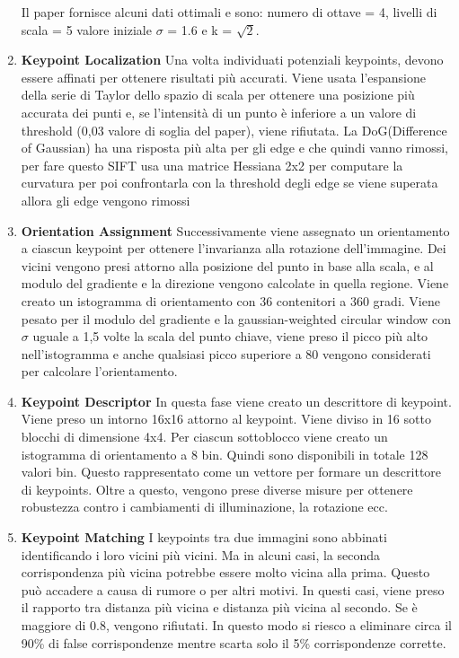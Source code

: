 \begin{enumerate}
\begin{figure}[ht]
	      \end{figure}
	      Il paper fornisce alcuni dati ottimali e sono: numero di ottave = 4, livelli di scala = 5 valore iniziale $\sigma$ = 1.6 e k = $\sqrt{2}$.
	\item \textbf{Keypoint Localization}
	      Una volta individuati potenziali keypoints, devono essere affinati per ottenere risultati più accurati. Viene usata l'espansione della serie di Taylor dello spazio di scala per ottenere una posizione più accurata dei punti e, se l'intensità di un punto è inferiore a un valore di threshold (0,03 valore di soglia del paper), viene rifiutata.
	      La DoG(Difference of Gaussian) ha una risposta più alta per gli edge e che quindi vanno rimossi, per fare questo SIFT usa una matrice Hessiana 2x2 per computare la curvatura per poi confrontarla con la threshold degli edge se viene superata allora gli edge vengono rimossi
	\item \textbf{Orientation Assignment}
	      Successivamente viene assegnato un orientamento a ciascun keypoint per ottenere l'invarianza alla rotazione dell'immagine. Dei vicini vengono presi attorno alla posizione del punto in base alla scala, e al modulo del gradiente e la direzione vengono calcolate in quella regione. Viene creato un istogramma di orientamento con 36 contenitori a 360 gradi. Viene pesato per il modulo del gradiente e la gaussian-weighted circular window con $\sigma$ uguale a 1,5 volte la scala del punto chiave, viene preso il picco più alto nell'istogramma e anche qualsiasi picco superiore a 80 vengono considerati per calcolare l'orientamento.
	\item \textbf{Keypoint Descriptor}
	      In questa fase viene creato un descrittore di keypoint. Viene preso un intorno 16x16 attorno al keypoint. Viene  diviso in 16 sotto blocchi di dimensione 4x4. Per ciascun sottoblocco viene creato un istogramma di orientamento a 8 bin. Quindi sono disponibili in totale 128 valori bin. Questo rappresentato come un vettore per formare un descrittore di keypoints. Oltre a questo, vengono prese diverse misure per ottenere robustezza contro i cambiamenti di illuminazione, la rotazione ecc.
	\item \textbf{Keypoint Matching}
	      I keypoints tra due immagini sono abbinati identificando i loro vicini più vicini. Ma in alcuni casi, la seconda corrispondenza più vicina potrebbe essere molto vicina alla prima. Questo può accadere a causa di rumore o per altri motivi. In questi casi, viene preso il rapporto tra distanza più vicina e distanza più vicina al secondo. Se è maggiore di 0.8, vengono rifiutati. In questo modo si riesco a eliminare circa il 90\% di false corrispondenze mentre scarta solo il 5\% corrispondenze corrette.
\end{enumerate}
